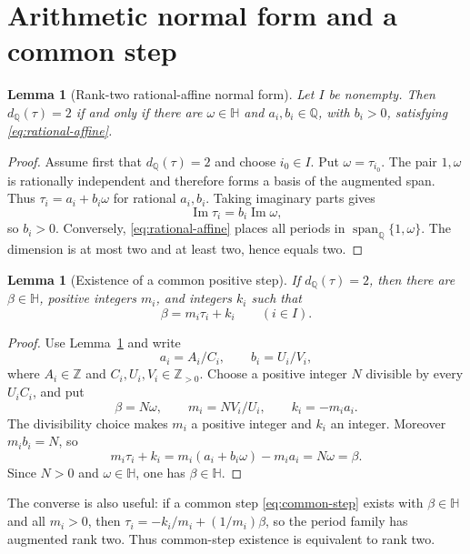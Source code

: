 \documentclass[11pt]{article}
\numberwithin{equation}{section}
\newtheorem{lemma}[theorem]{Lemma}
\theoremstyle{definition}
\theoremstyle{remark}
\newcommand{\Q}{\mathbb Q}
\newcommand{\Z}{\mathbb Z}
\newcommand{\HH}{\mathbb H}
\newcommand{\Span}{\operatorname{span}}
\begin{document}
\section{Arithmetic normal form and a common step}
\label{sec:arithmetic}

\begin{lemma}[Rank-two rational-affine normal form]
\label{lem:normal-form}
Let $I$ be nonempty.  Then $d_\Q(\tau)=2$ if and only if there are
$\omega\in\HH$ and $a_i,b_i\in\Q$, with $b_i>0$, satisfying
\eqref{eq:rational-affine}.
\end{lemma}

\begin{proof}
Assume first that $d_\Q(\tau)=2$ and choose $i_0\in I$.  Put
$\omega=\tau_{i_0}$.  The pair $1,\omega$ is rationally independent and
therefore forms a basis of the augmented span.  Thus
$\tau_i=a_i+b_i\omega$ for rational $a_i,b_i$.  Taking imaginary parts
gives
\[
 \operatorname{Im}\tau_i=b_i\operatorname{Im}\omega,
\]
so $b_i>0$.  Conversely, \eqref{eq:rational-affine} places all periods in
$\Span_\Q\{1,\omega\}$.  The dimension is at most two and at least two,
hence equals two.
\end{proof}

\begin{lemma}[Existence of a common positive step]
\label{lem:common-step}
If $d_\Q(\tau)=2$, then there are $\beta\in\HH$, positive integers $m_i$,
and integers $k_i$ such that
\begin{equation}
 \beta=m_i\tau_i+k_i\qquad(i\in I).
 \label{eq:common-step}
\end{equation}
\end{lemma}

\begin{proof}
Use Lemma~\ref{lem:normal-form} and write
\[
 a_i=A_i/C_i,\qquad b_i=U_i/V_i,
\]
where $A_i\in\Z$ and $C_i,U_i,V_i\in\Z_{>0}$.  Choose a positive integer
$N$ divisible by every $U_iC_i$, and put
\[
 \beta=N\omega,\qquad m_i=NV_i/U_i,\qquad k_i=-m_i a_i.
\]
The divisibility choice makes $m_i$ a positive integer and $k_i$ an integer.
Moreover $m_ib_i=N$, so
\[
 m_i\tau_i+k_i=m_i(a_i+b_i\omega)-m_ia_i=N\omega=\beta.
\]
Since $N>0$ and $\omega\in\HH$, one has $\beta\in\HH$.
\end{proof}

The converse is also useful: if a common step \eqref{eq:common-step} exists
with $\beta\in\HH$ and all $m_i>0$, then
$\tau_i=-k_i/m_i+(1/m_i)\beta$, so the period family has augmented rank
two.  Thus common-step existence is equivalent to rank two.
\end{document}
